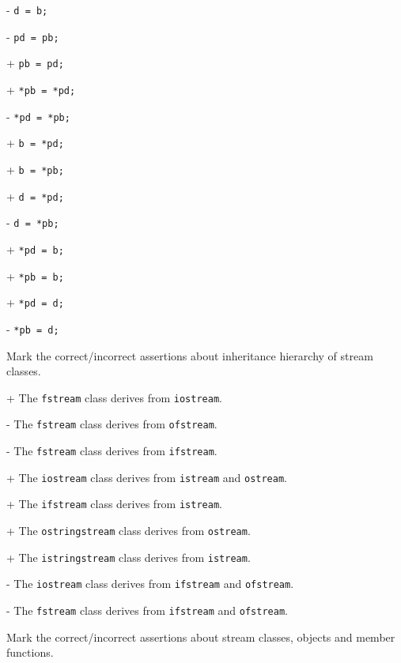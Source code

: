- \verb|d = b;|

- \verb|pd = pb;|

+ \verb|pb = pd;|

+ \verb|*pb = *pd;|

- \verb|*pd = *pb;|

+ \verb|b = *pd;|

+ \verb|b = *pb;|

+ \verb|d = *pd;|

- \verb|d = *pb;|

+ \verb|*pd = b;|

+ \verb|*pb = b;|

+ \verb|*pd = d;|

- \verb|*pb = d;|

Mark the correct/incorrect assertions about inheritance
hierarchy of stream classes.

+ The \verb|fstream| class derives from \verb|iostream|.

- The \verb|fstream| class derives from \verb|ofstream|.

- The \verb|fstream| class derives from \verb|ifstream|.

+ The \verb|iostream| class derives from \verb|istream| and \verb|ostream|.

+ The \verb|ifstream| class derives from \verb|istream|.

+ The \verb|ostringstream| class derives from \verb|ostream|.

+ The \verb|istringstream| class derives from \verb|istream|.

- The \verb|iostream| class derives from \verb|ifstream| and \verb|ofstream|.

- The \verb|fstream| class derives from \verb|ifstream| and \verb|ofstream|.

Mark the correct/incorrect assertions about stream classes, objects and
member functions.

